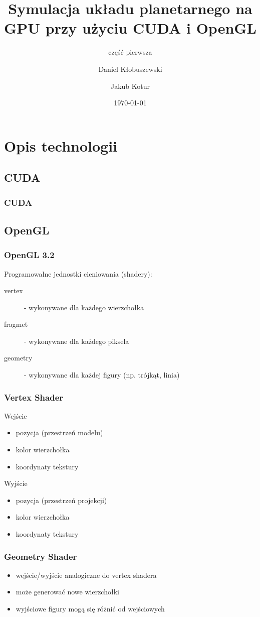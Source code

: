 \documentclass{beamer}
\title{Symulacja układu planetarnego na GPU przy użyciu CUDA i OpenGL}
\subtitle{część pierwsza}
\author{Daniel Kłobuszewski\and Jakub Kotur}
\institute{Politechnika Warszawska}
\date{\today}
\begin{document}
\frame[plain]{\titlepage}


\section{Opis technologii}\label{sec:opis technologii}


\subsection{CUDA}\label{sub:cuda}
\frame
{
	\frametitle{CUDA}
}

\subsection{OpenGL}\label{sub:opengl}

\frame
{
	\frametitle{OpenGL 3.2}

	Programowalne jednostki cieniowania (shadery):

	\begin{description}
	\item[vertex] - wykonywane dla każdego wierzchołka
	\item[fragmet] - wykonywane dla każdego piksela
	\pause
	\item[geometry] - wykonywane dla każdej figury (np. trójkąt, linia)
	\end{description}

}

\frame
{
	\frametitle{Vertex Shader}
	\begin{block}{Wejście}
	\begin{itemize}
	\item pozycja (przestrzeń modelu)
	\item kolor wierzchołka
	\item koordynaty tekstury
	\end{itemize}
	\end{block}
	\begin{block}{Wyjście}
	\begin{itemize}
	\item pozycja (przestrzeń projekcji)
	\item kolor wierzchołka
	\item koordynaty tekstury
	\end{itemize}
	\end{block}
}

\frame
{
	\frametitle{Geometry Shader}

	\begin{itemize}
	\item wejście/wyjście analogiczne do vertex shadera
	\item może generować nowe wierzchołki
	\item wyjściowe figury mogą się różnić od wejściowych
	\end{itemize}
}
\end{document}
